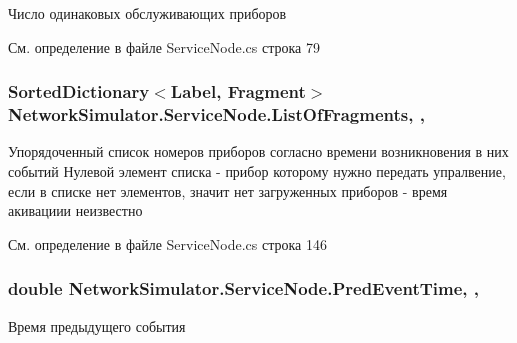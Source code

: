 Число одинаковых обслуживающих приборов 



См. определение в файле Service\+Node.\+cs строка 79

\subsubsection[{\texorpdfstring{List\+Of\+Fragments}{ListOfFragments}}]{\setlength{\rightskip}{0pt plus 5cm}Sorted\+Dictionary$<${\bf Label}, {\bf Fragment}$>$ Network\+Simulator.\+Service\+Node.\+List\+Of\+Fragments\hspace{0.3cm}{\ttfamily [get]}, {\ttfamily [set]}, {\ttfamily [protected]}}\hypertarget{class_network_simulator_1_1_service_node_aec726744aa9a2c5a657424ecc9666f27}{}\label{class_network_simulator_1_1_service_node_aec726744aa9a2c5a657424ecc9666f27}


Упорядоченный список номеров приборов согласно времени возникновения в них событий Нулевой элемент списка -\/ прибор которому нужно передать упралвение, если в списке нет элементов, значит нет загруженных приборов -\/ время акивациии неизвестно 



См. определение в файле Service\+Node.\+cs строка 146

\subsubsection[{\texorpdfstring{Pred\+Event\+Time}{PredEventTime}}]{\setlength{\rightskip}{0pt plus 5cm}double Network\+Simulator.\+Service\+Node.\+Pred\+Event\+Time\hspace{0.3cm}{\ttfamily [get]}, {\ttfamily [set]}, {\ttfamily [private]}}\hypertarget{class_network_simulator_1_1_service_node_a5417a341416b75444bb1d853788228a7}{}\label{class_network_simulator_1_1_service_node_a5417a341416b75444bb1d853788228a7}


Время предыдущего события 



